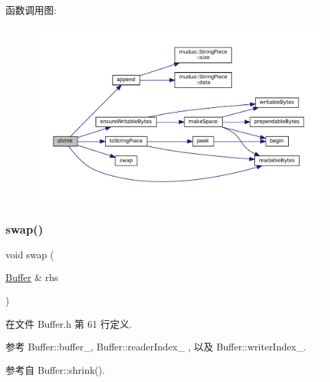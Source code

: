 函数调用图\+:
\nopagebreak
\begin{figure}[H]
\begin{center}
\leavevmode
\includegraphics[width=350pt]{classmuduo_1_1net_1_1Buffer_a69095875ff26fe7eff163afde6eb7c9e_cgraph}
\end{center}
\end{figure}
\mbox{\label{classmuduo_1_1net_1_1Buffer_a5a6560acf9880bf7a3b210c07bb3db2e}} 
\subsubsection{\texorpdfstring{swap()}{swap()}}
{\footnotesize\ttfamily void swap (\begin{DoxyParamCaption}\item[{\hyperlink{classmuduo_1_1net_1_1Buffer}{Buffer} \&}]{rhs }\end{DoxyParamCaption})\hspace{0.3cm}{\ttfamily [inline]}}



在文件 Buffer.\+h 第 61 行定义.



参考 Buffer\+::buffer\+\_\+, Buffer\+::reader\+Index\+\_\+ , 以及 Buffer\+::writer\+Index\+\_\+.



参考自 Buffer\+::shrink().

